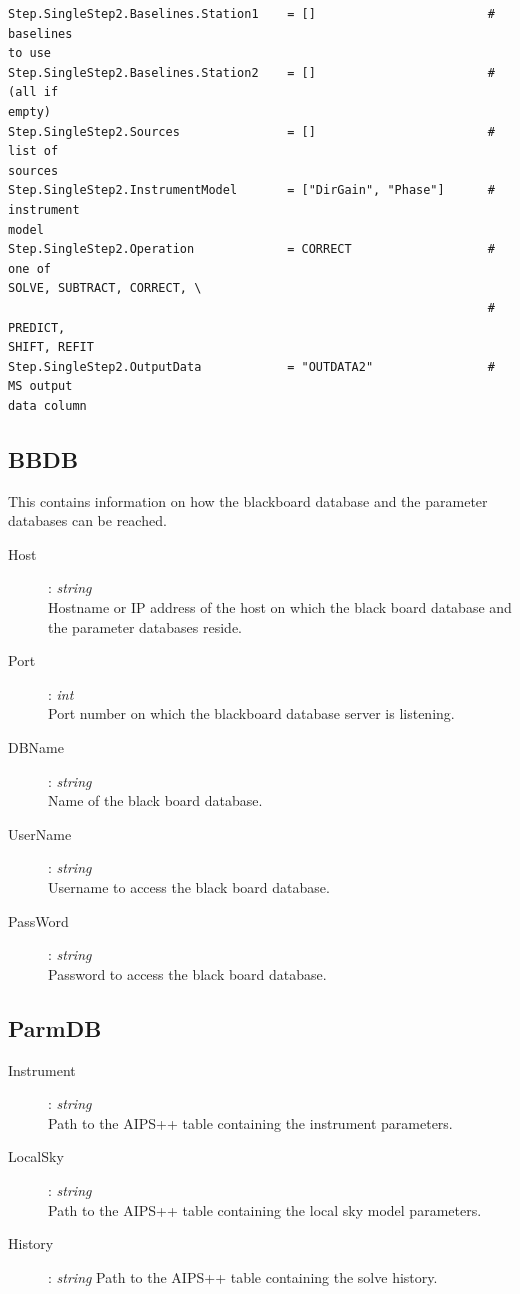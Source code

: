\documentclass[10pt]{lofar}
\begin{document}
{\begin{verbatim}
Step.SingleStep2.Baselines.Station1    = []                        # baselines
to use
Step.SingleStep2.Baselines.Station2    = []                        # (all if
empty)
Step.SingleStep2.Sources               = []                        # list of
sources
Step.SingleStep2.InstrumentModel       = ["DirGain", "Phase"]      # instrument
model
Step.SingleStep2.Operation             = CORRECT                   # one of
SOLVE, SUBTRACT, CORRECT, \
                                                                   # PREDICT,
SHIFT, REFIT
Step.SingleStep2.OutputData            = "OUTDATA2"                # MS output
data column
\end{verbatim}
}

\subsection*{BBDB}
\label{app-bbdb}
This contains information on how the blackboard database and the parameter
databases can be reached.
\begin{description}
\item [Host] : \emph{string} \\
    Hostname or IP address of the host on which the black board database and the
parameter databases reside.
\item [Port] : \emph{int} \\
    Port number on which the blackboard database server is listening.
\item [DBName] : \emph{string} \\
    Name of the black board database.
\item [UserName] : \emph{string} \\
    Username to access the black board database.
\item [PassWord] : \emph{string} \\
    Password to access the black board database.
\end{description}

\subsection*{ParmDB}
\label{app-parmdb}
\begin{description}
\item [Instrument] : \emph{string} \\
    Path to the AIPS++ table containing the instrument parameters.
\item [LocalSky] : \emph{string} \\
    Path to the AIPS++ table containing the local sky model parameters.
\item [History] : \emph{string}
    Path to the AIPS++ table containing the solve history.
\end{description}
\end{document}

